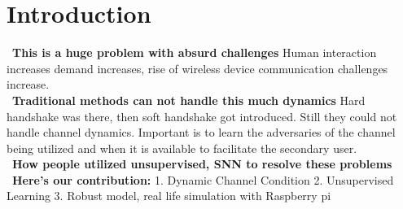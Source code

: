 \section{Introduction}
~\textbf{This is a huge problem with absurd challenges} Human interaction increases demand increases, rise of wireless device communication challenges increase.
\\
~\textbf{Traditional methods can not handle this much dynamics} Hard handshake was there, then soft handshake got introduced. Still they could not handle channel dynamics. Important is to learn the adversaries of the channel being utilized and when it is available to facilitate the secondary user.
\\
~\textbf{How people utilized unsupervised, SNN to resolve these problems}
\\
~\textbf{Here's our contribution:}
1. Dynamic Channel Condition
2. Unsupervised Learning
3. Robust model, real life simulation with Raspberry pi